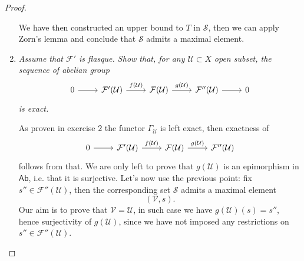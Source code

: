 \documentclass[../Main]{subfiles}
\begin{document}
\begin{proof}
\begin{enumerate}
		We have then constructed an upper bound to $T$ in $\mathcal{S}$, then we can
		apply Zorn's lemma and conclude that $\mathcal{S}$ admits a maximal element.


	\item {\em Assume that $\mathcal{F}'$ is flasque. Show that, for any $\mathcal{U} \subset X$}
		{\em open subset, the sequence of abelian group}
		\begin{equation}
		\begin{tikzcd}
			0 \arrow[r, "", rightarrow] &
			\mathcal{F}'(\mathcal{U}) \arrow[r, "f(\mathcal{U})", rightarrow] &
			\mathcal{F}(\mathcal{U}) \arrow[r, "g(\mathcal{U})", rightarrow] &
			\mathcal{F}''(\mathcal{U}) \arrow[r, "", rightarrow] &
			0
		\end{tikzcd}
		\end{equation}
		{\em is exact.}

		As proven in exercise $2$ the functor $\Gamma_{\mathcal{U}}$ is left exact,
		then exactness of
		\begin{equation}
		\begin{tikzcd}
			0 \arrow[r, "", rightarrow] &
			\mathcal{F}'(\mathcal{U}) \arrow[r, "f(\mathcal{U})", rightarrow] &
			\mathcal{F}(\mathcal{U}) \arrow[r, "g(\mathcal{U})", rightarrow] &
			\mathcal{F}''(\mathcal{U})
		\end{tikzcd}
		\end{equation}
		follows from that.
		We are only left to prove that $g(\mathcal{U})$ is an epimorphism
		in $\mathsf{Ab}$, i.e. that it is surjective.
		Let's now use the previous point: fix $s'' \in \mathcal{F}''(\mathcal{U})$, then
		the corresponding set $\mathcal{S}$ admits a maximal element
		\begin{equation}
		\left( \mathcal{V}, s\right)
		.\end{equation}
		Our aim is to prove that $\mathcal{V} = \mathcal{U}$, in such case we have
		$g(\mathcal{U})(s) = s''$, hence surjectivity of $g(\mathcal{U})$, since we have not
		imposed any restrictions on $s'' \in \mathcal{F}''(\mathcal{U})$.


\end{enumerate}
\end{proof}
\end{document}
